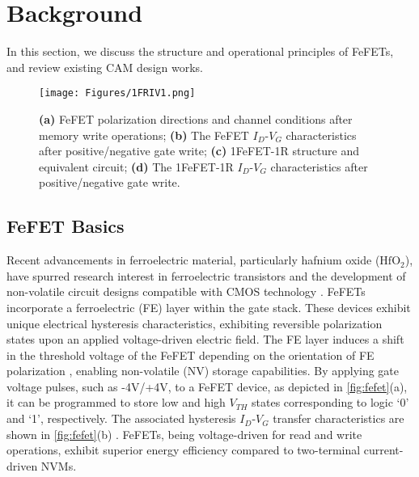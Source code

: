 \section{Background}
\label{sec:background}

In this section, we discuss the structure and operational principles of FeFETs, and review existing CAM design works.

\begin{figure}%
    \centering
    \texttt{[image: Figures/1FRIV1.png]}
    \caption{\textbf{(a)} FeFET polarization directions and channel conditions after memory write operations;  \textbf{(b)} The FeFET $\textit{I}_\textit{D}$-$\textit{V}_\textit{G}$ characteristics after positive/negative gate write; %
    \textbf{(c)} 1FeFET-1R structure and equivalent circuit; \textbf{(d)} The 1FeFET-1R $\textit{I}_\textit{D}$-$\textit{V}_\textit{G}$ characteristics after positive/negative gate write.
    }
   
 
    \label{fig:fefet}
\end{figure}

\subsection{FeFET Basics}
\label{sec:device}
\setlength{\abovecaptionskip}{2pt}
\setlength{\belowcaptionskip}{2pt}


Recent advancements in ferroelectric material, particularly hafnium oxide ($\text{HfO}_\text{2}$), have spurred research interest in ferroelectric transistors  and the development of non-volatile circuit designs compatible with CMOS technology \cite{yin2020fecam}. 
FeFETs 
incorporate a ferroelectric 
(FE) layer  within the gate stack. These devices exhibit unique electrical hysteresis characteristics, exhibiting reversible polarization states upon an applied voltage-driven electric field. 
The FE layer induces a shift in the threshold voltage of the FeFET depending on the orientation of FE polarization \cite{FeFET-capacitor}, enabling non-volatile (NV) storage capabilities. 
By applying gate voltage pulses, such as -4V/+4V, to a FeFET device, as depicted in \autoref{fig:fefet}(a), it can be programmed to store low and high $\textit{V}_\textit{TH}$ states corresponding to logic ‘0’ and ‘1’, respectively. 
The associated hysteresis  $\textit{I}_\textit{D}$-$\textit{V}_\textit{G}$ transfer characteristics are shown in \autoref{fig:fefet}(b) \cite{transfer-characteristics}. FeFETs, being voltage-driven for read and write operations, exhibit superior energy efficiency compared to two-terminal current-driven NVMs.

